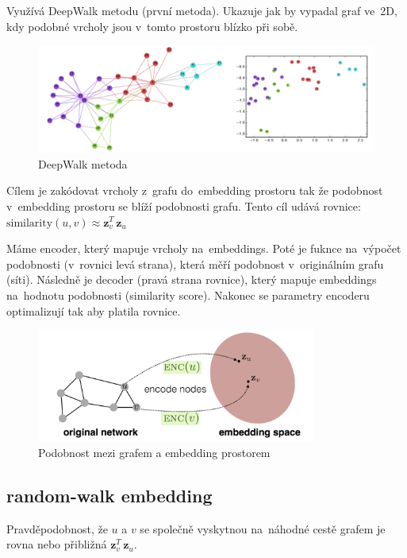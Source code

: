 Využívá DeepWalk metodu (první metoda). 
Ukazuje jak by vypadal graf ve~2D, kdy podobné vrcholy jsou v~tomto prostoru blízko při sobě.

\begin{figure}[ht]
    \centering
    \includegraphics[width=\textwidth]{images/11_deepwalk-graf}
    \caption{DeepWalk metoda}
\end{figure}

Cílem je zakódovat vrcholy z~grafu do~embedding prostoru tak že podobnost v~embedding prostoru se blíží podobnosti grafu.
Tento cíl udává rovnice:
$\text{similarity}(u,v)\approx \mathbf{z}_{v}^{T}\,\mathbf{z}_{u}$

Máme encoder, který mapuje vrcholy na~embeddings. 
Poté je fuknce na~výpočet podobnosti (v~rovnici levá strana), která měří podobnost v~originálním grafu (síti).
Následně je decoder (pravá strana rovnice), který mapuje embeddings na~hodnotu podobnosti (similarity score).
Nakonec se parametry encoderu optimalizují tak aby platila rovnice.

\begin{figure}[ht]
    \centering
    \includegraphics[height=10em]{images/11_similarity}
    \caption{Podobnost mezi grafem a embedding prostorem}
\end{figure}

\subsection{random-walk embedding}

Pravděpodobnost, že $u$ a $v$ se společně vyskytnou na~náhodné cestě grafem je rovna nebo přibližná $\mathbf{z}_{v}^{T}\,\mathbf{z}_{u}$.

